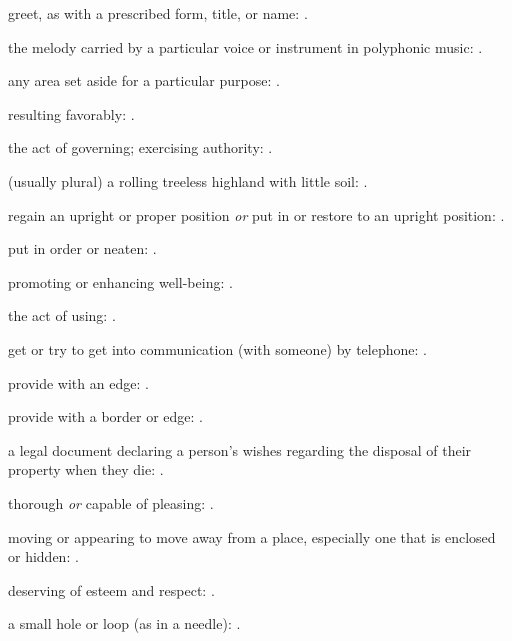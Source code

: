  greet, as with a prescribed form, title, or name:   .

  the melody carried by a particular voice or instrument in polyphonic music:   .

  any area set aside for a particular purpose:   .

  resulting favorably:   .

  the act of governing; exercising authority:   .

  (usually plural) a rolling treeless highland with little soil: .

  regain an upright or proper position \textit{or} put in or restore to an upright position: .

  put in order or neaten:   .

  promoting or enhancing well-being:   .

  the act of using:   .

  get or try to get into communication (with someone) by telephone:   .

  provide with an edge: .

  provide with a border or edge:   .

  a legal document declaring a person's wishes regarding the disposal of their property when they die:   .

  thorough \textit{or} capable of pleasing: .

  moving or appearing to move away from a place, especially one that is enclosed or hidden: .

  deserving of esteem and respect:   .

  a small hole or loop (as in a needle): .

